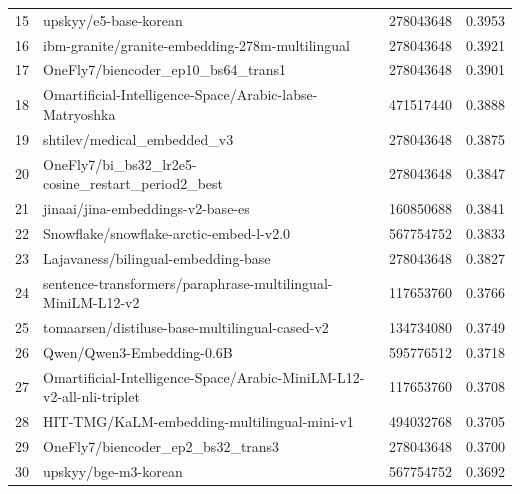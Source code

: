 {\begin{xltabular}{\textwidth}{l X rc}
    15               & upskyy/e5-base-korean                                                      & 278043648     & 0.3953       \\
    16               & ibm-granite/granite-embedding-278m-multilingual                            & 278043648     & 0.3921       \\
    17               & OneFly7/biencoder\_ep10\_bs64\_trans1                                      & 278043648     & 0.3901       \\
    18               & Omartificial-Intelligence-Space/Arabic-labse-Matryoshka                    & 471517440     & 0.3888       \\
    19               & shtilev/medical\_embedded\_v3                                              & 278043648     & 0.3875       \\
    20               & OneFly7/bi\_bs32\_lr2e5-cosine\_restart\_period2\_best                    & 278043648     & 0.3847       \\
    21               & jinaai/jina-embeddings-v2-base-es                                          & 160850688     & 0.3841       \\
    22               & Snowflake/snowflake-arctic-embed-l-v2.0                                    & 567754752     & 0.3833       \\
    23               & Lajavaness/bilingual-embedding-base                                        & 278043648     & 0.3827       \\
    24               & sentence-transformers/paraphrase-multilingual-MiniLM-L12-v2                & 117653760     & 0.3766       \\
    25               & tomaarsen/distiluse-base-multilingual-cased-v2                             & 134734080     & 0.3749       \\
    26               & Qwen/Qwen3-Embedding-0.6B                                                  & 595776512     & 0.3718       \\
    27               & Omartificial-Intelligence-Space/Arabic-MiniLM-L12-v2-all-nli-triplet       & 117653760     & 0.3708       \\
    28               & HIT-TMG/KaLM-embedding-multilingual-mini-v1                                & 494032768     & 0.3705       \\
    29               & OneFly7/biencoder\_ep2\_bs32\_trans3                                       & 278043648     & 0.3700       \\
    30               & upskyy/bge-m3-korean                                                       & 567754752     & 0.3692       \\

\end{xltabular}}
